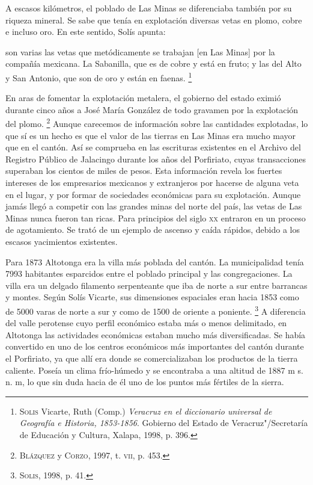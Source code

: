 \documentclass[14pt,twoside,final]{extbook} %
\let\oldfootnote\footnote
\renewcommand\footnote[1]{%
\oldfootnote{\hspace{1mm}#1}}
\begin{document}
A escasos kilómetros, el poblado de Las Minas se diferenciaba también por su riqueza mineral. Se sabe que tenía en explotación diversas vetas en plomo, cobre e incluso oro. En este sentido, Solís apunta:
\begin{quoting}
son varias las vetas que metódicamente se trabajan [en Las Minas] por la compañía mexicana. La Sabanilla, que es de cobre y está en fruto; y las del Alto y San Antonio, que son de oro y están en faenas.\footnote{\textsc{Solis} Vicarte, Ruth (Comp.) \emph{Veracruz en el diccionario universal de Geografía e Historia, 1853-1856}. Gobierno del Estado de Veracruz"/Secretaría de Educación y Cultura, Xalapa, 1998, p. 396.}
\end{quoting}
En aras de fomentar la explotación metalera, el gobierno del estado eximió durante cinco años a José María González de todo gravamen por la explotación del plomo.\footnote{\textsc{Blázquez} y \textsc{Corzo}, 1997, t. \textsc{vii}, p. 453.} Aunque carecemos de información sobre las cantidades explotadas, lo que sí es un hecho es que el valor de las tierras en Las Minas era mucho mayor que en el cantón. Así se comprueba en las escrituras existentes en el Archivo del Registro Público de Jalacingo durante los años del Porfiriato, cuyas transacciones superaban los cientos de miles de pesos. Esta información revela los fuertes intereses de los empresarios mexicanos y extranjeros por hacerse de alguna veta en el lugar, y por formar de sociedades económicas para su explotación. Aunque jamás llegó a competir con las grandes minas del norte del país, las vetas de Las Minas nunca fueron tan ricas. Para principios del siglo \textsc{xx} entraron en un proceso de agotamiento. Se trató de un ejemplo de ascenso y caída rápidos, debido a los escasos yacimientos existentes.

Para 1873 Altotonga era la villa más poblada del cantón. La municipalidad tenía 7993 habitantes esparcidos entre el poblado principal y las congregaciones. La villa era un delgado filamento serpenteante que iba de norte a sur entre barrancas y montes. Según Solís Vicarte, sus dimensiones espaciales eran hacia 1853 como de 5000 varas de norte a sur y como de 1500 de oriente a poniente.\footnote{\textsc{Solis}, 1998, p. 41.} A diferencia del valle perotense cuyo perfil económico estaba más o menos delimitado, en Altotonga las actividades económicas estaban mucho más diversificadas. Se había convertido en uno de los centros económicos más importantes del cantón durante el Porfiriato, ya que allí era donde se comercializaban los productos de la tierra caliente. Poseía un clima frío-húmedo y se encontraba a una altitud de 1887 m s. n. m, lo que sin duda hacia de él uno de los puntos más fértiles de la sierra.
\end{document}

